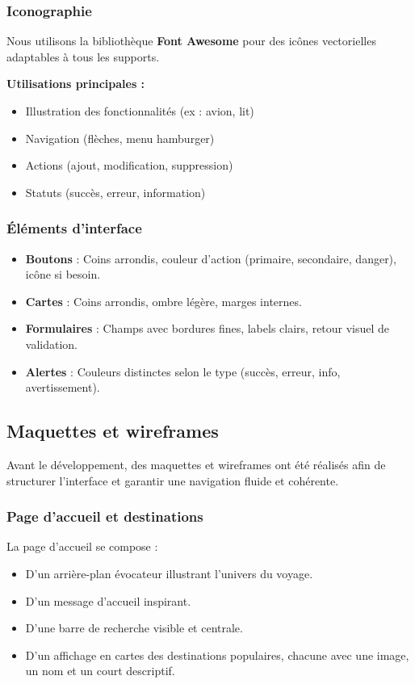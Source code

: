 \documentclass[a4paper,12pt]{article}
\begin{document}
\subsubsection{Iconographie}
Nous utilisons la bibliothèque \textbf{Font Awesome} pour des icônes vectorielles adaptables à tous les supports.

\textbf{Utilisations principales :}
\begin{itemize}
  \item Illustration des fonctionnalités (ex : avion, lit)
  \item Navigation (flèches, menu hamburger)
  \item Actions (ajout, modification, suppression)
  \item Statuts (succès, erreur, information)
\end{itemize}

\subsubsection{Éléments d’interface}
\begin{itemize}
  \item \textbf{Boutons} : Coins arrondis, couleur d’action (primaire, secondaire, danger), icône si besoin.
  \item \textbf{Cartes} : Coins arrondis, ombre légère, marges internes.
  \item \textbf{Formulaires} : Champs avec bordures fines, labels clairs, retour visuel de validation.
  \item \textbf{Alertes} : Couleurs distinctes selon le type (succès, erreur, info, avertissement).
\end{itemize}
\subsection{Maquettes et wireframes}

Avant le développement, des maquettes et wireframes ont été réalisés afin de structurer l’interface et garantir une navigation fluide et cohérente.

\subsubsection{Page d'accueil et destinations}

La page d’accueil se compose :

\begin{itemize}
  \item D’un arrière-plan évocateur illustrant l’univers du voyage.
  \item D’un message d’accueil inspirant.
  \item D’une barre de recherche visible et centrale.
  \item D’un affichage en cartes des destinations populaires, chacune avec une image, un nom et un court descriptif.
\end{itemize}
\end{document}
